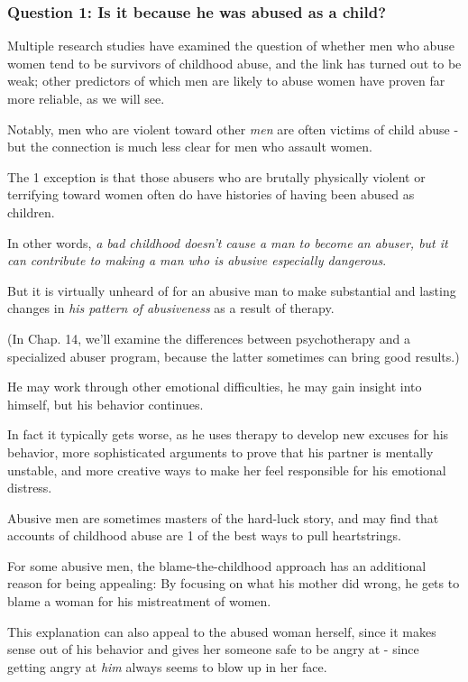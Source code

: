 \documentclass[oneside]{article}
\numberwithin{equation}{section}
\begin{document}
\subsubsection{Question 1: Is it because he was abused as a child?}
Multiple research studies have examined the question of whether men who abuse women tend to be survivors of childhood abuse, and the link has turned out to be weak; other predictors of which men are likely to abuse women have proven far more reliable, as we will see.

Notably, men who are violent toward other \textit{men} are often victims of child abuse - but the connection is much less clear for men who assault women.

The 1 exception is that those abusers who are brutally physically violent or terrifying toward women often do have histories of having been abused as children.

In other words, \textit{a bad childhood doesn't cause a man to become an abuser, but it can contribute to making a man who is abusive especially dangerous}.

%

But it is virtually unheard of for an abusive man to make substantial and lasting changes in \textit{his pattern of abusiveness} as a result of therapy.

(In Chap. 14, we'll examine the differences between psychotherapy and a specialized abuser program, because the latter sometimes can bring good results.)

He may work through other emotional difficulties, he may gain insight into himself, but his behavior continues.

In fact it typically gets worse, as he uses therapy to develop new excuses for his behavior, more sophisticated arguments to prove that his partner is mentally unstable, and more creative ways to make her feel responsible for his emotional distress.

Abusive men are sometimes masters of the hard-luck story, and may find that accounts of childhood abuse are 1 of the best ways to pull heartstrings.

%
For some abusive men, the blame-the-childhood approach has an additional reason for being appealing: By focusing on what his mother did wrong, he gets to blame a woman for his mistreatment of women.

This explanation can also appeal to the abused woman herself, since it makes sense out of his behavior and gives her someone safe to be angry at - since getting angry at \textit{him} always seems to blow up in her face.
\end{document}
